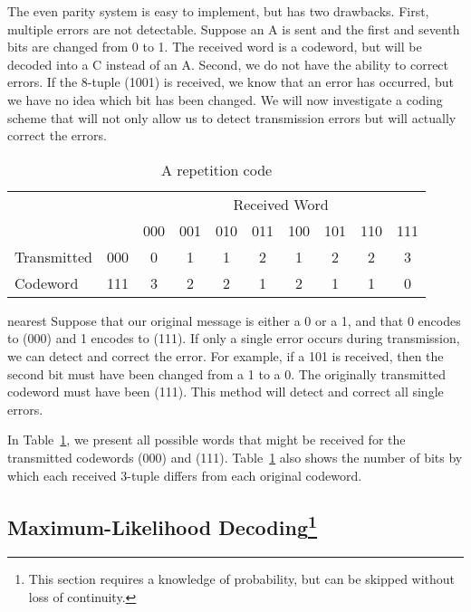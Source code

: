  
The even parity system is easy to implement, but has two drawbacks.
First, multiple errors are not detectable. Suppose an A is sent and 
the first and seventh bits are changed from 0 to 1. The received word
is a codeword, but will be decoded into a C instead of an A.
Second, we do not have the ability to correct errors.  If the 8-tuple
(1001) is received, we know that an error has occurred, but we
have no idea which bit has been changed. We will now investigate a
coding scheme that will not only allow us to detect transmission
errors but will actually correct the errors. 

 
 
\begin{table}[htb]\label{repetition_code}
\begin{center}{\small
\begin{tabular}{|lc|cccccccc|}
\hline
& & \multicolumn{8}{|c|}{Received Word}    \\
            &     & 000 & 001 & 010 & 011 & 100 & 101 & 110
& 111 \\ \hline
Transmitted & 000 & 0   & 1   & 1   & 2   & 1   & 2   & 2
& 3 \\
Codeword   & 111 & 3   &  2  & 2   &  1  &  2  &   1 &  1
&  0 \\ \hline
\end{tabular}
}
\caption{A repetition code}
\end{center}
\end{table}

 
\begin{example}{nearest}
Suppose that our original message is either a 0 or a 1, and that 0
encodes to (000) and 1 encodes to (111). If only a single
error occurs during transmission, we can detect and correct the
error. For example, if a 101 is received, then the second bit must
have been changed from a 1 to a 0.  The originally transmitted
codeword must have been (111). 	This method will detect and correct 
all single errors. 
 
 
In Table~\ref{repetition_code}, we present all possible words that might be received
for the transmitted codewords (000) and (111). Table~\ref{repetition_code} also shows 
the number of bits by which each received 3-tuple differs from each
original codeword. 
\end{example}
 
 
 
\subsection*{Maximum-Likelihood Decoding\footnote{This section
requires a knowledge of probability, but can be
skipped without loss of continuity.}}
 

